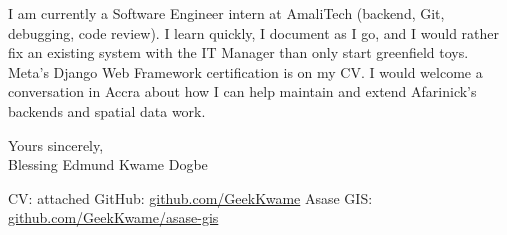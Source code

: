 \documentclass[letterpaper,11pt]{article}
\begin{document}
I am currently a Software Engineer intern at AmaliTech (backend, Git, debugging, code review). I learn quickly, I document as I go, and I would rather fix an existing system with the IT Manager than only start greenfield toys. Meta's Django Web Framework certification is on my CV. I would welcome a conversation in Accra about how I can help maintain and extend Afarinick's backends and spatial data work.

Yours sincerely,\\[1.2em]
Blessing Edmund Kwame Dogbe

\vspace{0.4em}
{\small
CV: attached \quad
GitHub: \href{https://github.com/GeekKwame}{github.com/GeekKwame} \quad
Asase GIS: \href{https://github.com/GeekKwame/asase-gis}{github.com/GeekKwame/asase-gis}
}
\end{document}
